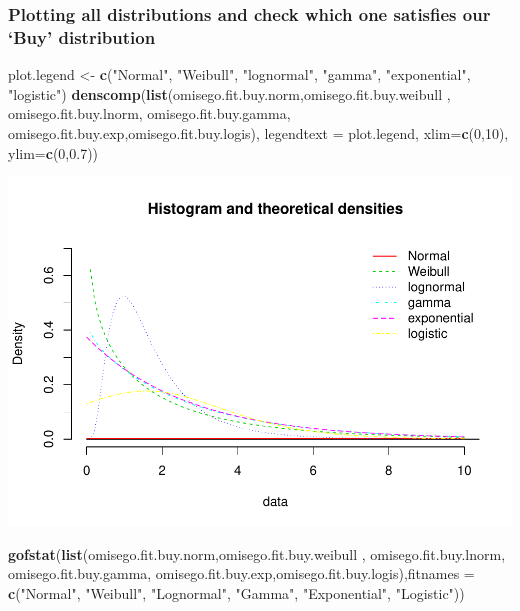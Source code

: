 \documentclass[]{article}
\newenvironment{Shaded}{\begin{snugshade}}{\end{snugshade}}
\newcommand{\KeywordTok}[1]{\textcolor[rgb]{0.13,0.29,0.53}{\textbf{#1}}}
\newcommand{\DataTypeTok}[1]{\textcolor[rgb]{0.13,0.29,0.53}{#1}}
\newcommand{\DecValTok}[1]{\textcolor[rgb]{0.00,0.00,0.81}{#1}}
\newcommand{\FloatTok}[1]{\textcolor[rgb]{0.00,0.00,0.81}{#1}}
\newcommand{\StringTok}[1]{\textcolor[rgb]{0.31,0.60,0.02}{#1}}
\newcommand{\NormalTok}[1]{#1}
\begin{document}
\subsubsection{\texorpdfstring{Plotting all distributions and check
which one satisfies our `Buy'
distribution}{Plotting all distributions and check which one satisfies our Buy distribution}}\label{plotting-all-distributions-and-check-which-one-satisfies-our-buy-distribution-2}

\begin{Shaded}
\begin{Highlighting}[]
\NormalTok{plot.legend <-}\StringTok{ }\KeywordTok{c}\NormalTok{(}\StringTok{"Normal"}\NormalTok{, }\StringTok{"Weibull"}\NormalTok{, }\StringTok{"lognormal"}\NormalTok{, }\StringTok{"gamma"}\NormalTok{, }\StringTok{"exponential"}\NormalTok{, }\StringTok{"logistic"}\NormalTok{)}
\KeywordTok{denscomp}\NormalTok{(}\KeywordTok{list}\NormalTok{(omisego.fit.buy.norm,omisego.fit.buy.weibull , omisego.fit.buy.lnorm, omisego.fit.buy.gamma, omisego.fit.buy.exp,omisego.fit.buy.logis), }\DataTypeTok{legendtext =}\NormalTok{ plot.legend, }\DataTypeTok{xlim=}\KeywordTok{c}\NormalTok{(}\DecValTok{0}\NormalTok{,}\DecValTok{10}\NormalTok{), }\DataTypeTok{ylim=}\KeywordTok{c}\NormalTok{(}\DecValTok{0}\NormalTok{,}\FloatTok{0.7}\NormalTok{))}
\end{Highlighting}
\end{Shaded}

\includegraphics{analysis_files/figure-latex/unnamed-chunk-52-1.pdf}

\begin{Shaded}
\begin{Highlighting}[]
\KeywordTok{gofstat}\NormalTok{(}\KeywordTok{list}\NormalTok{(omisego.fit.buy.norm,omisego.fit.buy.weibull , omisego.fit.buy.lnorm, omisego.fit.buy.gamma, omisego.fit.buy.exp,omisego.fit.buy.logis),}\DataTypeTok{fitnames =} \KeywordTok{c}\NormalTok{(}\StringTok{"Normal"}\NormalTok{, }\StringTok{"Weibull"}\NormalTok{, }\StringTok{"Lognormal"}\NormalTok{, }\StringTok{"Gamma"}\NormalTok{, }\StringTok{"Exponential"}\NormalTok{, }\StringTok{"Logistic"}\NormalTok{))}
\end{Highlighting}
\end{Shaded}
\end{document}
